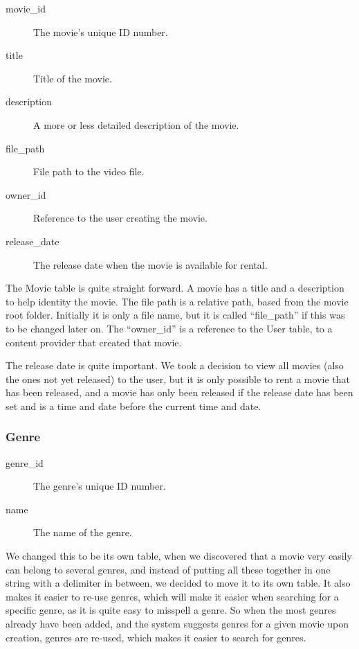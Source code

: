 \begin{description}
\item[movie_{id}] The movie's unique ID number.
\item[title] Title of the movie.
\item[description] A more or less detailed description of the movie.
\item[file_path] File path to the video file.
\item[owner_id] Reference to the user creating the movie.
\item[release_date] The release date when the movie is available for rental.
\end{description}

The Movie table is quite straight forward. A movie has a title and a description to help identity the movie. The file path is a relative path, based from the movie root folder. Initially it is only a file name, but it is called ``file_path'' if this was to be changed later on. The ``owner_id'' is a reference to the User table, to a content provider that created that movie.

The release date is quite important. We took a decision to view all movies (also the ones not yet released) to the user, but it is only possible to rent a movie that has been released, and a movie has only been released if the release date has been set and is a time and date before the current time and date.

\subsubsection{Genre}
\label{database_design_tables_genre}

\begin{description}
\item[genre_id] The genre's unique ID number.
\item[name] The name of the genre.
\end{description}

We changed this to be its own table, when we discovered that a movie very easily can belong to several genres, and instead of putting all these together in one string with a delimiter in between, we decided to move it to its own table. It also makes it easier to re-use genres, which will make it easier when searching for a specific genre, as it is quite easy to misspell a genre. So when the most genres already have been added, and the system suggests genres for a given movie upon creation, genres are re-used, which makes it easier to search for genres.

